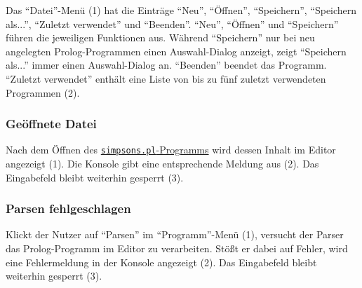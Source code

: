 \documentclass[parskip=full,11pt,twoside]{scrartcl}
\begin{document}
\begin{minipage}{\linewidth}
\end{minipage}

Das \enquote{Datei}-Menü (1) hat die Einträge \enquote{Neu}, \enquote{Öffnen}, \enquote{Speichern}, \enquote{Speichern als...}, \enquote{Zuletzt verwendet} und \enquote{Beenden}.
\enquote{Neu}, \enquote{Öffnen} und \enquote{Speichern} führen die jeweiligen Funktionen aus.
Während \enquote{Speichern} nur bei neu angelegten Prolog-Programmen einen Auswahl-Dialog anzeigt, zeigt \enquote{Speichern als...} immer einen Auswahl-Dialog an.
\enquote{Beenden} beendet das Programm.
\enquote{Zuletzt verwendet} enthält eine Liste von bis zu fünf zuletzt verwendeten Programmen (2).

\subsubsection{Geöffnete Datei}

\begin{minipage}{\linewidth}
\end{minipage}

Nach dem Öffnen des \hyperref[appendix:simpsons]{\texttt{simpsons.pl}-Programms} wird dessen Inhalt im Editor angezeigt (1).
Die Konsole gibt eine entsprechende Meldung aus (2).
Das Eingabefeld bleibt weiterhin gesperrt (3).

\subsubsection{Parsen fehlgeschlagen}

\begin{minipage}{\linewidth}
\end{minipage}

Klickt der Nutzer auf \enquote{Parsen} im \enquote{Programm}-Menü (1), versucht der Parser das Prolog-Programm im Editor zu verarbeiten.
Stößt er dabei auf Fehler, wird eine Fehlermeldung in der Konsole angezeigt (2).
Das Eingabefeld bleibt weiterhin gesperrt (3).
\end{document}
